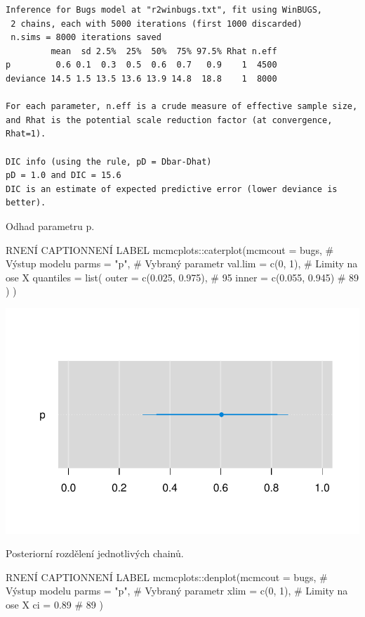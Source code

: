 \documentclass[
  11pt,
  a4paper]{report}
\begin{document}
\begin{verbatim}
Inference for Bugs model at "r2winbugs.txt", fit using WinBUGS,
 2 chains, each with 5000 iterations (first 1000 discarded)
 n.sims = 8000 iterations saved
         mean  sd 2.5%  25%  50%  75% 97.5% Rhat n.eff
p         0.6 0.1  0.3  0.5  0.6  0.7   0.9    1  4500
deviance 14.5 1.5 13.5 13.6 13.9 14.8  18.8    1  8000

For each parameter, n.eff is a crude measure of effective sample size,
and Rhat is the potential scale reduction factor (at convergence, Rhat=1).

DIC info (using the rule, pD = Dbar-Dhat)
pD = 1.0 and DIC = 15.6
DIC is an estimate of expected predictive error (lower deviance is better).
\end{verbatim}

Odhad parametru p.

\begin{code}{R}{NENÍ CAPTION}{NENÍ LABEL}
mcmcplots::caterplot(mcmcout = bugs,             # Výstup modelu
                     parms = "p",                # Vybraný parametr
                     val.lim = c(0, 1),          # Limity na ose X
                     quantiles = list(
                        outer = c(0.025, 0.975), # 95%
                        inner = c(0.055, 0.945)  # 89%
                     )
)
\end{code}

\includegraphics{index_files/figure-pdf/unnamed-chunk-6-1.pdf}

Posteriorní rozdělení jednotlivých chainů.

\begin{code}{R}{NENÍ CAPTION}{NENÍ LABEL}
mcmcplots::denplot(mcmcout = bugs, # Výstup modelu
                   parms = "p",    # Vybraný parametr
                   xlim = c(0, 1), # Limity na ose X
                   ci = 0.89       # 89%
)
\end{code}
\end{document}
